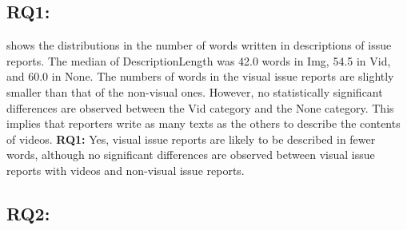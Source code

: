 

\subsection*{RQ1: \RQone{}}

 shows the distributions in the number of words 
written in descriptions of issue reports. 
The median of DescriptionLength was 42.0 words in Img, 
54.5 in Vid, and 60.0 in None. 
The numbers of words in the visual issue reports are slightly smaller than 
that of the non-visual ones.
However, no statistically significant differences are observed 
between the Vid category and the None category. 
This implies that reporters write as many texts as the others 
to describe the contents of videos. 
\vspace{-0.2cm}%
\summarybox
{
{\bf RQ1: }{Yes, 
visual issue reports are likely to be described in fewer words, although no significant differences are observed between visual issue reports with videos and non-visual issue reports. 
}}

\subsection*{RQ2: \RQtwo{}}


